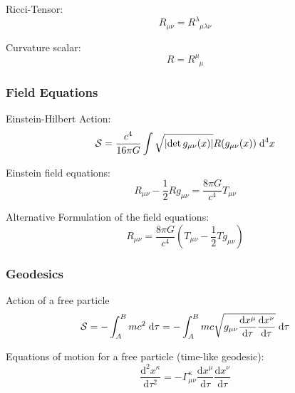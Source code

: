 			\noindent
			Ricci-Tensor:
			\begin{equation}
				R_{\mu\nu} = R^\lambda_{\phantom{\lambda}\mu\lambda\nu}
			\end{equation}

			\noindent
			Curvature scalar:
			\begin{equation}
				R = R^\mu_{\phantom{\mu}\mu}
			\end{equation}

		\subsubsection{Field Equations}
			\noindent
			Einstein-Hilbert Action:
			\begin{equation}
				\mathcal{S} = \frac{c^4}{16\pi G} \int \sqrt{\left|\det{g_{\mu\nu}(x)}\right|} R(g_{\mu\nu}(x))\;\mathrm{d}^4 x
			\end{equation}

			\noindent
			Einstein field equations:
			\begin{equation}
				R_{\mu\nu} - \frac{1}{2} R g_{\mu\nu} = \frac{8\pi G}{c^4} T_{\mu\nu}
			\end{equation}

			\noindent
			Alternative Formulation of the field equations:
			\begin{equation}
				R_{\mu\nu} = \frac{8\pi G}{c^4} \left( T_{\mu\nu} - \frac{1}{2} T g_{\mu\nu} \right)
			\end{equation}


		\subsubsection{Geodesics}
			\noindent
			Action of a free particle%
			\begin{equation}
				\mathcal{S} = -\int_A^B mc^2\;\mathrm{d} \tau = -\int_A^B mc\sqrt{g_{\mu\nu} \frac{\mathrm{d} x^\mu}{\mathrm{d} \tau} \frac{\mathrm{d} x^\nu}{\mathrm{d} \tau}} \;\mathrm{d} \tau
			\end{equation}

			\noindent
			Equations of motion for a free particle (time-like geodesic):%
			\begin{equation}
				\frac{\mathrm{d}^2 x^\kappa}{\mathrm{d}\tau^2}=-\Gamma_{\mu\nu}^{\kappa}\frac{\mathrm{d}x^\mu}{\mathrm{d}\tau}\frac{\mathrm{d}x^\nu}{\mathrm{d}\tau}
			\end{equation}

